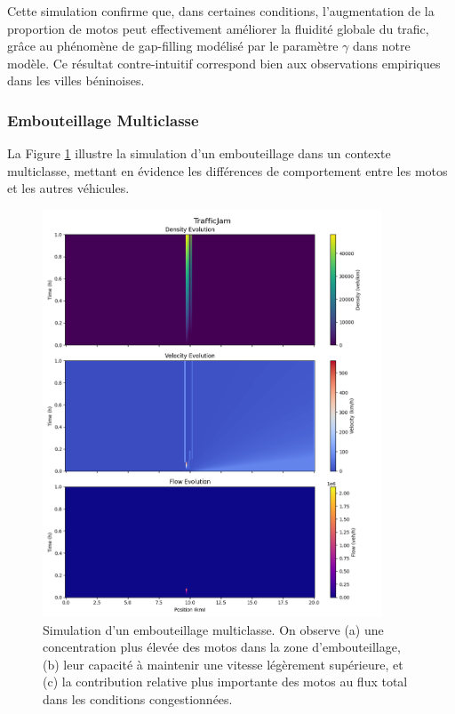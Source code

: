 Cette simulation confirme que, dans certaines conditions, l'augmentation de la proportion de motos peut effectivement améliorer la fluidité globale du trafic, grâce au phénomène de gap-filling modélisé par le paramètre $\gamma$ dans notre modèle. Ce résultat contre-intuitif correspond bien aux observations empiriques dans les villes béninoises.

\subsubsection{Embouteillage Multiclasse}
\label{subsubsec:trafficjam_multiclasse}

La Figure \ref{fig:trafficjam_multiclasse} illustre la simulation d'un embouteillage dans un contexte multiclasse, mettant en évidence les différences de comportement entre les motos et les autres véhicules.

\begin{figure}[htbp]
\centering
\includegraphics[width=0.9\textwidth]{simulations/MULTICLASS/trafficjam/trafficjam.png}
\caption{Simulation d'un embouteillage multiclasse. On observe (a) une concentration plus élevée des motos dans la zone d'embouteillage, (b) leur capacité à maintenir une vitesse légèrement supérieure, et (c) la contribution relative plus importante des motos au flux total dans les conditions congestionnées.}
\label{fig:trafficjam_multiclasse}
\end{figure}

